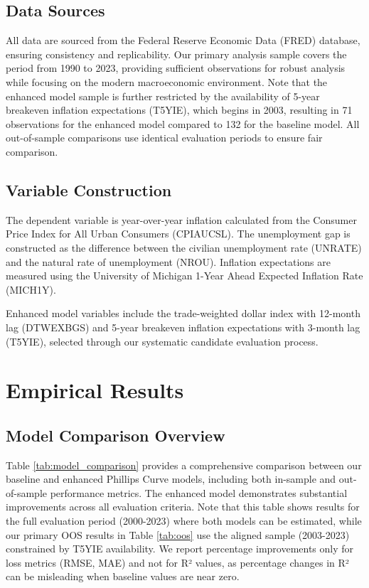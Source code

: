 \documentclass[12pt]{article}
\begin{document}
\subsection{Data Sources}

All data are sourced from the Federal Reserve Economic Data (FRED) database, ensuring consistency and replicability. Our primary analysis sample covers the period from 1990 to 2023, providing sufficient observations for robust analysis while focusing on the modern macroeconomic environment. Note that the enhanced model sample is further restricted by the availability of 5-year breakeven inflation expectations (T5YIE), which begins in 2003, resulting in 71 observations for the enhanced model compared to 132 for the baseline model. All out-of-sample comparisons use identical evaluation periods to ensure fair comparison.

\subsection{Variable Construction}

The dependent variable is year-over-year inflation calculated from the Consumer Price Index for All Urban Consumers (CPIAUCSL). The unemployment gap is constructed as the difference between the civilian unemployment rate (UNRATE) and the natural rate of unemployment (NROU). Inflation expectations are measured using the University of Michigan 1-Year Ahead Expected Inflation Rate (MICH1Y).

Enhanced model variables include the trade-weighted dollar index with 12-month lag (DTWEXBGS) and 5-year breakeven inflation expectations with 3-month lag (T5YIE), selected through our systematic candidate evaluation process.

\section{Empirical Results}

\subsection{Model Comparison Overview}

Table \ref{tab:model_comparison} provides a comprehensive comparison between our baseline and enhanced Phillips Curve models, including both in-sample and out-of-sample performance metrics. The enhanced model demonstrates substantial improvements across all evaluation criteria. Note that this table shows results for the full evaluation period (2000-2023) where both models can be estimated, while our primary OOS results in Table \ref{tab:oos} use the aligned sample (2003-2023) constrained by T5YIE availability. We report percentage improvements only for loss metrics (RMSE, MAE) and not for R² values, as percentage changes in R² can be misleading when baseline values are near zero.
\end{document}
